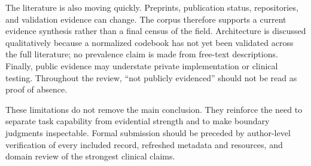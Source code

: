 The literature is also moving quickly. Preprints, publication status, repositories, and validation evidence can change. The corpus therefore supports a current evidence synthesis rather than a final census of the field. Architecture is discussed qualitatively because a normalized codebook has not yet been validated across the full literature; no prevalence claim is made from free-text descriptions. Finally, public evidence may understate private implementation or clinical testing. Throughout the review, ``not publicly evidenced'' should not be read as proof of absence.

These limitations do not remove the main conclusion. They reinforce the need to separate task capability from evidential strength and to make boundary judgments inspectable. Formal submission should be preceded by author-level verification of every included record, refreshed metadata and resources, and domain review of the strongest clinical claims.
